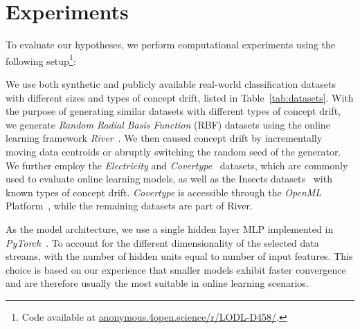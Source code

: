\documentclass[runningheads]{llncs}
\begin{document}
\section{Experiments}\label{sec:experiments}

To evaluate our hypotheses, we perform computational experiments using the following setup\footnote[2]{Code available at \url{anonymous.4open.science/r/LODL-D458/}.}:

We use both synthetic and publicly available real-world classification datasets with different sizes and types of concept drift, listed in Table~\ref{tab:datasets}.
With the purpose of generating similar datasets with different types of concept drift, we generate \textit{Random Radial Basis Function} (RBF) datasets using the online learning framework \textit{River}~\cite{montiel2021river}.
We then caused concept drift by incrementally moving data centroids or abruptly switching the random seed of the generator.
We further employ the \textit{Electricity} and \textit{Covertype}~\cite{misc_covertype_31} datasets, which are commonly used to evaluate online learning models, as well as the Insects datasets~\cite{souzaChallengesBenchmarkingStream2020} with known types of concept drift.
\textit{Covertype} is accessible through the \textit{OpenML} Platform~\cite{vanschorenOpenMLNetworkedScience2014}, while the remaining datasets are part of River.

As the model architecture, we use a single hidden layer MLP implemented in \textit{PyTorch}~\cite{paszkePyTorchImperativeStyle2019}.
To account for the different dimensionality of the selected data streams, with the number of hidden units equal to number of input features.
This choice is based on our experience that smaller models exhibit faster convergence and are therefore usually the most suitable in online learning scenarios.
\end{document}
